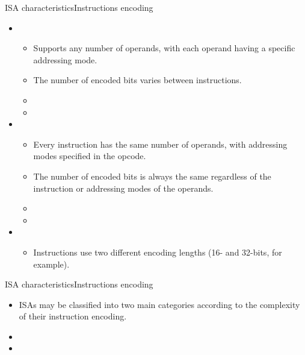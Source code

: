 \begin{frame}{\acs{ISA} characteristics}{Instructions encoding}
\begin{itemize}
  \item {} 
 \begin{itemize}
    \item Supports any number of operands, with each operand having a specific addressing mode.
    \item The number of encoded bits varies between instructions.
    \item {}
    \item {}
  \end{itemize}
  \item {} 
  \begin{itemize}
    \item Every instruction has the same number of operands, with addressing modes specified in the opcode.
    \item The number of encoded bits is always the same regardless of the instruction or addressing modes of the operands.
    \item {}
    \item {}
  \end{itemize}
  \item {}
  \begin{itemize}
  \item Instructions use two different encoding lengths (16- and 32-bits, for example).
  \end{itemize}
\end{itemize}   
\end{frame}

\begin{frame}{\acs{ISA} characteristics}{Instructions encoding}
  \begin{itemize}
    \item \acp{ISA} may be classified into two main categories according to the complexity of their instruction encoding.
    \item {}
    \item {}
  \end{itemize}     
\end{frame}


